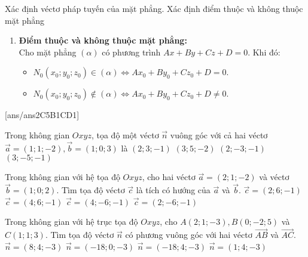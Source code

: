 \begin{dang}{Xác định véctơ pháp tuyến của mặt phẳng. Xác định điểm thuộc và không thuộc mặt phẳng}
\begin{enumerate}[label=\bf\arabic*.]
\begin{itemize}
		\end{itemize}
		\item \textbf{Điểm thuộc và không thuộc mặt phẳng:}\\
		Cho mặt phẳng $(\alpha)$ có phương trình $A x+B y+C z+D=0$. Khi đó: 
		\begin{itemize}
			\item $N_0\left(x_0; y_0; z_0\right) \in(\alpha) \Leftrightarrow A x_0+B y_0+C z_0+D=0$.
			\item $N_0\left(x_0; y_0; z_0\right) \notin(\alpha) \Leftrightarrow A x_0+B y_0+C z_0+D \neq 0$.	
		\end{itemize}
	\end{enumerate}
\end{dang}

\TN
{}[ans/ans2C5B1CD1]
\begin{ex}%
	Trong không gian $O x y z$, tọa độ một véctơ $\overrightarrow{n}$ vuông góc với cả hai véctơ $\overrightarrow{a}=(1; 1;-2), \overrightarrow{b}=(1; 0; 3)$ là
	\choice
	{$(2; 3;-1)$}
	{$(3; 5;-2)$}
	{$(2;-3;-1)$}
	{\True $(3;-5;-1)$}
\end{ex}

\begin{ex}%
	Trong không gian với hệ tọa độ $O x y z$, cho hai véctơ $\overrightarrow{a}=(2; 1;-2)$ và véctơ $\overrightarrow{b}=(1; 0; 2)$. Tìm tọa độ véctơ $\overrightarrow{c}$ là tích có hướng của $\overrightarrow{a}$ và $\overrightarrow{b}$.
	\choice
	{$\overrightarrow{c}=(2; 6;-1)$}
	{$\overrightarrow{c}=(4; 6;-1)$}
	{$\overrightarrow{c}=(4;-6;-1)$}
	{\True $\overrightarrow{c}=(2;-6;-1)$}
\end{ex}

\begin{ex}%
	Trong không gian với hệ trục tọa độ $O x y z$, cho $A(2; 1;-3), B(0;-2; 5)$ và $C(1; 1; 3)$. Tìm tọa độ véctơ $\overrightarrow{n}$ có phương vuông góc với hai véctơ $\overrightarrow{A B}$ và $\overrightarrow{A C}$.
	\choice
	{$\overrightarrow{n}=(8; 4;-3)$}
	{$\overrightarrow{n}=(-18; 0;-3)$}
	{\True $\overrightarrow{n}=(-18; 4;-3)$}
	{$\overrightarrow{n}=(1; 4;-3)$}
\end{ex}


